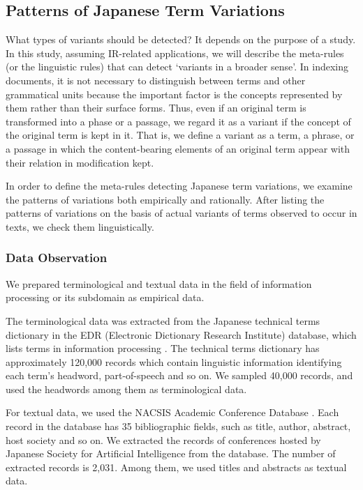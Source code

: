 \subsection{Patterns of Japanese Term Variations}

What types of variants should be detected? It depends on the purpose of a study. In this study, assuming IR-related applications, we will describe the meta-rules (or the linguistic rules) that can detect `variants in a broader sense'. In indexing documents, it is not necessary to distinguish between terms and other grammatical units because the important factor is the concepts represented by them rather than their surface forms. Thus, even if an original term is transformed into a phase or a passage, we regard it as a variant if the concept of the original term is kept in it. That is, we define a variant as a term, a phrase, or a passage in which the content-bearing elements of an original term appear with their relation in modification kept.

In order to define the meta-rules detecting Japanese term variations, we examine the patterns of variations both empirically and rationally. After listing the patterns of variations on the basis of actual variants of terms observed to occur in texts, we check them linguistically.

\subsubsection{Data Observation}

We prepared terminological and textual data in the field of information processing or its subdomain as empirical data.

The terminological data was extracted from the Japanese technical terms dictionary in the EDR (Electronic Dictionary Research Institute) database, which lists terms in information processing \cite{EDR}. The technical terms dictionary has approximately 120,000 records which contain linguistic information identifying each term's headword, part-of-speech and so on. We sampled 40,000 records, and used the headwords among them as terminological data.

For textual data, we used the NACSIS Academic Conference Database \cite{NACSIS}. Each record in the database has 35 bibliographic fields, such as title, author, abstract, host society and so on. We extracted the records of conferences hosted by Japanese Society for Artificial Intelligence from the database. The number of extracted records is 2,031. Among them, we used titles and abstracts as textual data.

